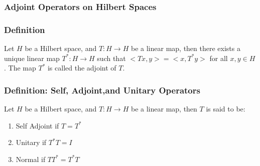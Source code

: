 \documentclass[12pt]{article}
\begin{document}
\subsubsection*{Adjoint Operators on Hilbert Spaces}
\subsubsection*{Definition}
Let $H$ be a Hilbert space, and $T: H \to H$ be a linear map, then there exists a unique linear map $T^*: H \to H$ such that $<Tx,y> = <x,T^*y>$ for all $x,y \in H$. The map $T^*$ is called the adjoint of $T$.

\subsubsection*{Definition: Self, Adjoint,and Unitary Operators}
Let $H$ be a Hilbert space, and $T: H \to H$ be a linear map, then $T$ is said to be:
\begin{enumerate}
    \item Self Adjoint if $T = T^*$
    \item Unitary if $T^*T = I$
    \item Normal if $TT^* = T^*T$ 
\end{enumerate}
\end{document}
